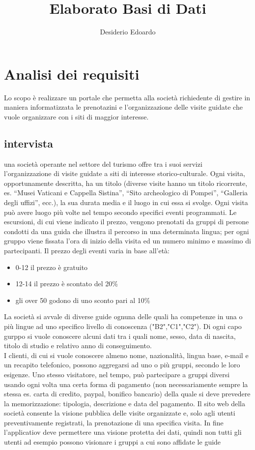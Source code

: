 \documentclass[a4paper,12pt]{report}
\title{Elaborato Basi di Dati}
\author{Desiderio Edoardo}
\begin{document}
\maketitle
\titlepage
\tableofcontents
\newpage

\chapter{Analisi dei requisiti}
Lo scopo è realizzare un portale che permetta alla società richiedente di gestire in maniera informatizzata le prenotazini e l'organizzazione
delle visite guidate che vuole organizzare con i siti di maggior interesse.
\section{intervista}
una	 società	 operante	 nel	 settore	 del	 turismo	 offre	 tra	 i	 suoi	 servizi	 l’organizzazione	 di	 	 visite
guidate	a	siti	di	interesse	storico-culturale.
Ogni	visita,	opportunamente	descritta,	ha	un	 titolo	 (diverse	visite	hanno	un	 titolo	 ricorrente,	es.
“Musei	Vaticani	e	Cappella	Sistina”,	“Sito	archeologico	di	Pompei”,	“Galleria	degli	uffizi”,	ecc.),	la
sua	durata	media		e	il	luogo		in	cui	essa	si	svolge.	Ogni	visita	può	avere	luogo	più	volte	nel	tempo
secondo	specifici	eventi	programmati.
Le escursioni,	di	cui	viene	indicato	il	prezzo,	vengono	prenotati	da	gruppi	di	persone	condotti	da	una
guida	che	illustra	il	percorso	in	una	determinata	lingua;	per	ogni	gruppo	viene	fissata	l’ora	di	inizio
della	visita	ed	un	numero	minimo	e	massimo	di	partecipanti.
Il prezzo degli eventi varia in base all'età:
\begin{itemize}
	\item 0-12 il prezzo è gratuito
	\item 12-14 il prezzo è scontato del 20\%
	\item gli over 50 godono di uno sconto pari al 10\%
\end{itemize}
La	società	si	avvale	di	diverse	guide	ognuna	delle	quali	ha	competenze	in	una	o	più	lingue	ad	uno
specifico	 livello	 di	 conoscenza	 ("B2","C1","C2"). Di ogni capo gurppo	 si	 vuole
conoscere	 alcuni	 dati	 tra	 i	 quali	 nome,	 sesso,	 data	 di	 nascita,	 titolo	 di	 studio	 e	 relativo	 anno	 di
conseguimento.
\\
I	clienti,	di	cui	si	vuole	conoscere	almeno	nome,	nazionalità,	lingua	base,	e-mail	e	un	 recapito
telefonico,	 possono	 aggregarsi	 ad	 uno	 o	 più	 gruppi,	 secondo	 le	 loro	 esigenze.	 Uno	 stesso
visitatore,	 nel	 tempo,	 può	 partecipare	 a	 gruppi	 diversi	 usando	 ogni	 volta	 una	 certa	 forma	 di
pagamento	(non	necessariamente	sempre	la	stessa	es.	carta	di	credito,	paypal,	bonifico	bancario)
della	quale	si	deve	prevedere	la	memorizzazione:	tipologia,	descrizione	e	data	del	pagamento.
Il	 sito	 web	 della	 società	 consente	 la	 visione	 pubblica	 delle	 visite	 organizzate	 e,	 solo	 agli	 utenti
preventivamente	registrati,	la	prenotazione	di	una	specifica	visita. In fine l'applicatiov
deve permettere una visione protetta dei dati, quindi non tutti gli utenti ad esempio possono
visionare i gruppi a cui sono affidate le guide
\end{document}
